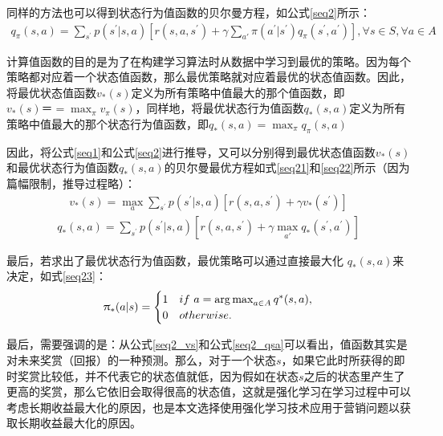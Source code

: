 同样的方法也可以得到状态行为值函数的贝尔曼方程，如公式\eqref{seq2}所示：
\begin{equation}
\label{seq2}
\begin{aligned}
q_{\pi}(s,a)=\sum_{s^{'}}p(s^{'}|s,a)[r(s,a,s^{'})+ \gamma \sum_{a'}\pi(a^{'}|s^{'}) q_{\pi}(s^{'},a^{'})], \forall s \in S, \forall a \in A
\end{aligned}
\end{equation}

计算值函数的目的是为了在构建学习算法时从数据中学习到最优的策略。因为每个策略都对应着一个状态值函数，那么最优策略就对应着最优的状态值函数。因此，将最优状态值函数$v_{*}(s)$定义为所有策略中值最大的那个值函数，即$v_{*}(s)＝=\max_{\pi}v_{\pi}(s)$，同样地，将最优状态行为值函数$q_{*}(s,a)$定义为所有策略中值最大的那个状态行为值函数，即$q_{*}(s,a)=\max_{\pi}q_{\pi}(s,a)$

因此，将公式\eqref{seq1}和公式\eqref{seq2}进行推导，又可以分别得到最优状态值函数$v_{*}(s)$和最优状态行为值函数$q_{*}(s,a)$的贝尔曼最优方程如式\eqref{seq21}和\eqref{seq22}所示（因为篇幅限制，推导过程略）：
\begin{equation}\label{seq21}
\begin{aligned}
v_{*}(s)=\max_{a}\sum_{s^{'}}p(s^{'}|s,a)[r(s,a,s^{'})+\gamma v_{*}(s^{'})]
\end{aligned}
\end{equation}
\begin{equation}\label{seq22}
\begin{aligned}
q_{*}(s,a)=\sum_{s^{'}}p(s^{'}|s,a)[r(s,a,s^{'}) +\gamma \max_{a'} q_{*}(s^{'},a^{'})]
\end{aligned}
\end{equation}

最后，若求出了最优状态行为值函数，最优策略可以通过直接最大化 $q_{*}(s,a)$来决定，如式\eqref{seq23}：
\begin{equation}\label{seq23}
\begin{aligned}
\uppi_{*}(a|s) = 
    \begin{cases}
        1 & if \ a=\operatorname*{arg\,max}_{a\in A}{q^{*}(s,a)},\\
        0 & otherwise.
    \end{cases}
\end{aligned}
\end{equation}

最后，需要强调的是：从公式\eqref{seq2_vs}和公式\eqref{seq2_qsa}可以看出，值函数其实是对未来奖赏（回报）的一种预测。那么，对于一个状态$s$，如果它此时所获得的即时奖赏比较低，并不代表它的状态值就低，因为假如在状态$s$之后的状态里产生了更高的奖赏，那么它依旧会取得很高的状态值，这就是强化学习在学习过程中可以考虑长期收益最大化的原因，也是本文选择使用强化学习技术应用于营销问题以获取长期收益最大化的原因。

